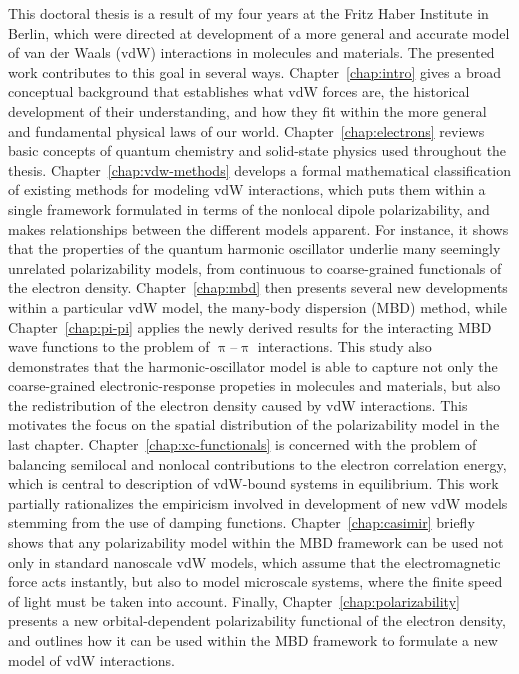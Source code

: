 
This doctoral thesis is a result of my four years at the Fritz Haber Institute in Berlin, which were directed at development of a more general and accurate model of van der Waals (vdW) interactions in molecules and materials.
The presented work contributes to this goal in several ways.
Chapter~\ref{chap:intro} gives a broad conceptual background that establishes what vdW forces are, the historical development of their understanding, and how they fit within the more general and fundamental physical laws of our world.
Chapter~\ref{chap:electrons} reviews basic concepts of quantum chemistry and solid-state physics used throughout the thesis.
Chapter~\ref{chap:vdw-methods} develops a formal mathematical classification of existing methods for modeling vdW interactions, which puts them within a single framework formulated in terms of the nonlocal dipole polarizability, and makes relationships between the different models apparent.
For instance, it shows that the properties of the quantum harmonic oscillator underlie many seemingly unrelated polarizability models, from continuous to coarse-grained functionals of the electron density.
Chapter~\ref{chap:mbd} then presents several new developments within a particular vdW model, the many-body dispersion (MBD) method, while Chapter~\ref{chap:pi-pi} applies the newly derived results for the interacting MBD wave functions to the problem of $\uppi$--$\uppi$ interactions.
This study also demonstrates that the harmonic-oscillator model is able to capture not only the coarse-grained electronic-response propeties in molecules and materials, but also the redistribution of the electron density caused by vdW interactions.
This motivates the focus on the spatial distribution of the polarizability model in the last chapter.
Chapter~\ref{chap:xc-functionals} is concerned with the problem of balancing semilocal and nonlocal contributions to the electron correlation energy, which is central to description of vdW-bound systems in equilibrium.
This work partially rationalizes the empiricism involved in development of new vdW models stemming from the use of damping functions.
Chapter~\ref{chap:casimir} briefly shows that any polarizability model within the MBD framework can be used not only in standard nanoscale vdW models, which assume that the electromagnetic force acts instantly, but also to model microscale systems, where the finite speed of light must be taken into account.
Finally, Chapter~\ref{chap:polarizability} presents a new orbital-dependent polarizability functional of the electron density, and outlines how it can be used within the MBD framework to formulate a new model of vdW interactions.

